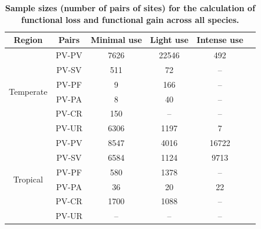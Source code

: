 \vspace{1cm}
\begin{table}[h!]
\renewcommand{\baselinestretch}{1}
\renewcommand{\arraystretch}{1.2}
\begin{center}\fontsize{9}{11}\selectfont
\caption[Sample sizes (number of pairs of sites) for the calculation of functional loss and functional gain across all species]{\textbf{Sample sizes (number of pairs of sites) for the calculation of functional loss and functional gain across all species.}} 
\label{SI3_Table4}  
\begin{tabular}{@{\extracolsep{5pt}} cccccc} 
\\[-1.8ex]\hline 
\textbf{Region}            & \textbf{Pairs} & \textbf{Minimal use} & \textbf{Light use} & \textbf{Intense use} \\ \hline
\multirow{6}{*}{Temperate} & PV-PV          & 7626                 & 22546              & 492                  \\
                           & PV-SV          & 511                  & 72                 & --                   \\
                           & PV-PF          & 9                    & 166                & --                   \\
                           & PV-PA          & 8                    & 40                 & --                   \\
                           & PV-CR          & 150                  & --                 & --                   \\
                           & PV-UR          & 6306                 & 1197               & 7                    \\ \hline
\multirow{6}{*}{Tropical}  & PV-PV          & 8547                 & 4016               & 16722                \\
                           & PV-SV          & 6584                 & 1124               & 9713                 \\
                           & PV-PF          & 580                  & 1378               & --                   \\
                           & PV-PA          & 36                   & 20                 & 22                   \\
                           & PV-CR          & 1700                 & 1088               & --                   \\
                           & PV-UR          & --                   & --                 & --                   \\ \hline
\end{tabular}
\end{center}
\end{table}

